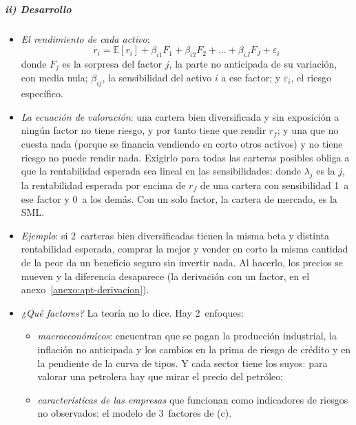 \documentclass[11pt]{article}
\begin{document}
\subparagraph{ii) Desarrollo}

\begin{itemize}
\item \emph{El rendimiento de cada activo}:
  \begin{equation}\label{eq:apt-factorial}
  r_i=\mathbb{E}[r_i]+\beta_{i1}F_1+\beta_{i2}F_2+\dots+\beta_{iJ}F_J+\varepsilon_i
  \end{equation}
  donde $F_j$ es la sorpresa del factor $j$, la parte no anticipada de su variación, con media nula; $\beta_{ij}$, la sensibilidad del activo $i$ a ese factor; y $\varepsilon_i$, el riesgo específico.
\item \emph{La ecuación de valoración}: una cartera bien diversificada y sin exposición a ningún factor no tiene riesgo, y por tanto tiene que rendir $r_f$; y una que no cuesta nada (porque se financia vendiendo en corto otros activos) y no tiene riesgo no puede rendir nada. Exigirlo para todas las carteras posibles obliga a que la rentabilidad esperada sea lineal en las sensibilidades\nocite{Ross1976Arbitrage}:
  donde $\lambda_j$ es la  $j$, la rentabilidad esperada por encima de $r_f$ de una cartera con sensibilidad 1~a ese factor y 0~a los demás. Con un solo factor, la cartera de mercado, es la SML.
\item \emph{Ejemplo}: si 2~carteras bien diversificadas tienen la misma beta y distinta rentabilidad esperada, comprar la mejor y vender en corto la misma cantidad de la peor da un beneficio seguro sin invertir nada. Al hacerlo, los precios se mueven y la diferencia desaparece (la derivación con un factor, en el anexo~\ref{anexo:apt-derivacion}).
\item \emph{¿Qué factores?} La teoría no lo dice. Hay 2~enfoques:
  \begin{itemize}
  \item \emph{macroeconómicos}: \textcite{ChenRollRoss1986} encuentran que se pagan la producción industrial, la inflación no anticipada y los cambios en la prima de riesgo de crédito y en la pendiente de la curva de tipos. Y cada sector tiene los suyos: para valorar una petrolera hay que mirar el precio del petróleo;
  \item \emph{características de las empresas} que funcionan como indicadores de riesgos no observados: el modelo de 3~factores de \textcite{FamaFrench1993} (c).
  \end{itemize}
\end{itemize}
\end{document}
